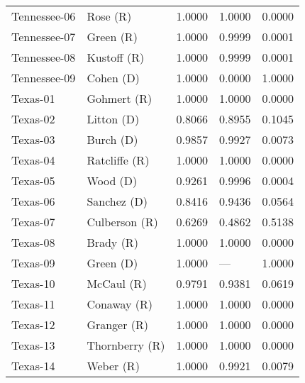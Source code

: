 \begin{longtable}{llrll}
      Tennessee-06 &             {\color{Red} Rose (R)} &       1.0000 &        1.0000 &        0.0000 \\
      Tennessee-07 &            {\color{Red} Green (R)} &       1.0000 &        0.9999 &        0.0001 \\
      Tennessee-08 &          {\color{Red} Kustoff (R)} &       1.0000 &        0.9999 &        0.0001 \\
      Tennessee-09 &           {\color{Blue} Cohen (D)} &       1.0000 &        0.0000 &        1.0000 \\
          Texas-01 &          {\color{Red} Gohmert (R)} &       1.0000 &        1.0000 &        0.0000 \\
          Texas-02 &          {\color{Blue} Litton (D)} &       0.8066 &        0.8955 &        0.1045 \\
          Texas-03 &           {\color{Blue} Burch (D)} &       0.9857 &        0.9927 &        0.0073 \\
          Texas-04 &        {\color{Red} Ratcliffe (R)} &       1.0000 &        1.0000 &        0.0000 \\
          Texas-05 &            {\color{Blue} Wood (D)} &       0.9261 &        0.9996 &        0.0004 \\
          Texas-06 &         {\color{Blue} Sanchez (D)} &       0.8416 &        0.9436 &        0.0564 \\
          Texas-07 &        {\color{Red} Culberson (R)} &       0.6269 &        0.4862 &        0.5138 \\
          Texas-08 &            {\color{Red} Brady (R)} &       1.0000 &        1.0000 &        0.0000 \\
          Texas-09 &           {\color{Blue} Green (D)} &       1.0000 &           --- &        1.0000 \\
          Texas-10 &           {\color{Red} McCaul (R)} &       0.9791 &        0.9381 &        0.0619 \\
          Texas-11 &          {\color{Red} Conaway (R)} &       1.0000 &        1.0000 &        0.0000 \\
          Texas-12 &          {\color{Red} Granger (R)} &       1.0000 &        1.0000 &        0.0000 \\
          Texas-13 &       {\color{Red} Thornberry (R)} &       1.0000 &        1.0000 &        0.0000 \\
          Texas-14 &            {\color{Red} Weber (R)} &       1.0000 &        0.9921 &        0.0079 \\

\end{longtable}
